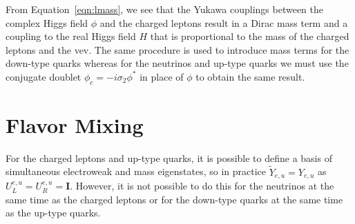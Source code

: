 From Equation~\ref{eqn:lmass}, we see that the Yukawa couplings between the complex Higgs field $\phi$ and the charged leptons result in a Dirac mass term and a coupling to the real Higgs field $H$ that is proportional to the mass of the charged leptons and the vev.
The same procedure is used to introduce mass terms for the down-type quarks whereas for the neutrinos and up-type quarks we must use the conjugate doublet $\phi_c = - i \sigma_2 \phi^*$ in place of $\phi$ to obtain the same result.

\section{Flavor Mixing}
\label{sec:flavor}

For the charged leptons and up-type quarks, it is possible to define a basis of simultaneous electroweak and mass eigenstates, so in practice $\tilde Y_{e,u} = Y_{e,u}$ as $U^{e,u}_L = U^{e,u}_R = \mathit{\mathbf{I}}$.
However, it is not possible to do this for the neutrinos at the same time as the charged leptons or for the down-type quarks at the same time as the up-type quarks.

